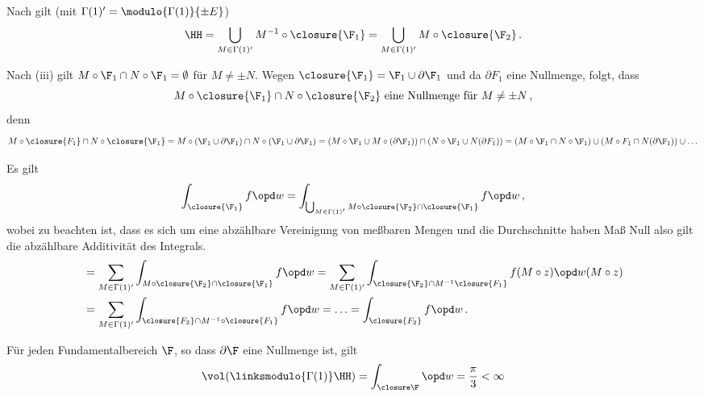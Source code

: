 \begin{bewe}
	Nach  gilt (mit $\Gamma(1)' = \modulo{\Gamma(1)}{\pm E}$)
	\[
		\HH = \bigcup_{M \in \Gamma(1)'} M^{-1} \circ \closure{\F_1} = \bigcup_{M \in \Gamma(1)'} M \circ \closure{\F_2}
		\,.
	\]
	
	Nach (iii) gilt $M \circ \F_1 \cap N \circ \F_1 = \emptyset$ für $M \not= \pm N$.
	Wegen $\closure{\F_1} = \F_1 \cup \partial\F_1$ und da $\partial F_1$ eine Nullmenge, folgt, dass
	\[
		M \circ \closure{\F_1} \cap N\circ\closure{\F_2} \text{ eine Nullmenge für } M\not=\pm N
		\,,
	\]
	denn
	\[
		M \circ \closure{F_1} \cap N \circ \closure{\F_1}= M \circ (\F_1 \cup \partial \F_1) \cap N \circ (\F_1 \cup \partial \F_1)
		= (M \circ \F_1 \cup M \circ (\partial \F_1)) \cap (N \circ \F_1 \cup N(\partial F_1))
		= (M \circ \F_1 \cap N \circ \F_1) \cup (M \circ F_1 \cap N(\partial \F_1)) \cup \ldots
	\]
	
	Es gilt
	\[
		\int_{\closure{\F_1}} f \opd w
		= \int_{\bigcup_{M \in \Gamma(1)'} M \circ \closure{\F_2} \cap \closure{\F_1}} f \opd w
		\,,
	\]
	wobei zu beachten ist, dass es sich um eine abzählbare Vereinigung von meßbaren Mengen und die Durchschnitte haben Maß Null also gilt die abzählbare Additivität des Integrals.
	\begin{align*}
		&= \sum_{M \in \Gamma(1)'} \int_{M\circ \closure{\F_2} \cap \closure{\F_1}} f \opd w
		= \sum_{M \in \Gamma(1)'} \int_{\closure{\F_2} \cap M^{-1}\closure{F_1}} f(M \circ z) \opd w(M \circ z) \\
		&= \sum_{M \in \Gamma(1)'} \int_{\closure{F_2} \cap M^{-1} \circ \closure{F_1}} f \opd w
		= \ldots = \int_{\closure{F_2}} f\opd w
		\,.
	\end{align*}
\end{bewe}

\begin{bsp}
	Für jeden Fundamentalbereich $\F$, so dass $\partial \F$ eine Nullmenge ist, gilt
	\[
		\vol(\linksmodulo{\Gamma(1)}\HH) = \int_{\closure \F} \opd w = \frac{\pi}{3} < \infty
	\]
\end{bsp}

